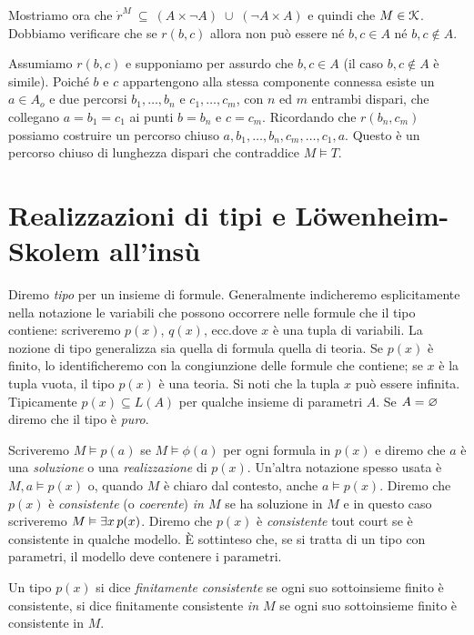 \begin{example}
Mostriamo ora che $\dot r^M\ \subseteq\ (A\times \neg A)\;\cup\;(\neg A\times A)$ e quindi che $M\in\EuScript K$. Dobbiamo verificare che se $r(b,c)$ allora non pu\`o essere n\'e $b,c\in A$ n\'e $b,c\notin A$. 

Assumiamo $r(b,c)$ e supponiamo per assurdo che $b,c\in A$ (il caso $b,c\notin A$ \`e simile). Poich\'e $b$ e $c$ appartengono alla stessa componente connessa esiste un $a\in A_o$ e due percorsi $b_1,\dots,b_n$ e $c_1,\dots,c_m$, con $n$ ed $m$ entrambi dispari, che collegano $a=b_1=c_1$ ai punti $b=b_n$ e $c=c_m$. Ricordando che $r(b_n,c_m)$ possiamo costruire un percorso chiuso $a,b_1,\dots,b_n,c_m,\dots,c_1,a$. Questo \`e un percorso chiuso di lunghezza dispari che contraddice $M\models T$.\QED
\end{example}



\section{Realizzazioni di tipi e L\"owenheim-Skolem all'ins\`u}
 
Diremo \emph{tipo\/} per un insieme di formule. Generalmente indicheremo esplicitamente nella notazione le variabili che possono occorrere nelle formule che il tipo contiene: scriveremo \emph{$p(x)$}, \emph{$q(x)$}, ecc.\@ dove $x$ \`e una tupla di variabili. La nozione di tipo generalizza sia quella di formula quella di teoria. Se $p(x)$ \`e finito, lo identificheremo con la congiunzione delle formule che contiene; se $x$ \`e la tupla vuota, il tipo $p(x)$ \`e una teoria. Si noti che la tupla $x$ pu\`o essere infinita. Tipicamente $p(x)\subseteq L(A)$ per qualche insieme di parametri $A$. Se $A=\varnothing$ diremo che il tipo \`e \emph{puro}. 

Scriveremo \emph{$M\models p(a)$} se $M\models\phi(a)$ per ogni formula in $p(x)$ e diremo che $a$ \`e una \emph{soluzione\/} o una \emph{realizzazione\/} di $p(x)$. Un'altra notazione spesso usata \`e \emph{$M,a\models p(x)$} o, quando $M$ \`e chiaro dal contesto, anche \emph{$a\models p(x)$}. Diremo che $p(x)$ \`e \emph{consistente\/} (o \emph{coerente}) \emph{in $M$\/} se ha soluzione in $M$ e in questo caso scriveremo \emph{$M\vDash\exists x\,p(x)$}.  Diremo che $p(x)$ \`e \emph{consistente\/} tout court se \`e consistente in qualche modello. \`E sottinteso che, se si tratta di un tipo con parametri, il modello deve contenere i parametri.

Un tipo $p(x)$ si dice \emph{finitamente consistente\/} se ogni suo sottoinsieme finito \`e consistente, si dice finitamente consistente \emph{in $M$\/} se ogni suo sottoinsieme finito \`e consistente in $M$.%

